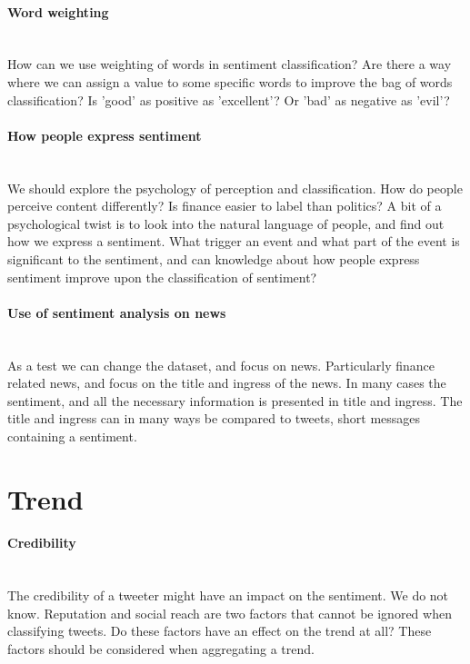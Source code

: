 \paragraph{Word weighting}
\hspace{0pt}\\
How can we use weighting of words in sentiment classification? Are there a way
where we can assign a value to some specific words to improve the bag of words
classification? Is 'good' as positive as 'excellent'? Or 'bad' as negative as
'evil'? 

\paragraph{How people express sentiment}
\hspace{0pt}\\
We should explore the psychology of perception and classification. How do
people perceive content differently? Is finance easier to label than politics?
A bit of a psychological twist is to look into the natural language of people,
and find out how we express a sentiment. What trigger an event and what part
of the event is significant to the sentiment, and can knowledge about how
people express sentiment improve upon the classification of sentiment? 

\paragraph{Use of sentiment analysis on news}
\hspace{0pt}\\
As a test we can change the dataset, and focus on news. Particularly finance
related news, and focus on the title and ingress of the news. In many cases the
sentiment, and all the necessary information is presented in title and
ingress. The title and ingress can in many ways be compared to tweets, short
messages containing a sentiment.   
%

\section{Trend}\label{future_work:trend}
\paragraph{Credibility}
\hspace{0pt}\\
The credibility of a tweeter might have an impact on the sentiment. We do not
know. Reputation and social reach are two factors that cannot be ignored when 
classifying tweets. Do these factors have an effect on the trend at all? These
factors should be considered when aggregating a trend. 

